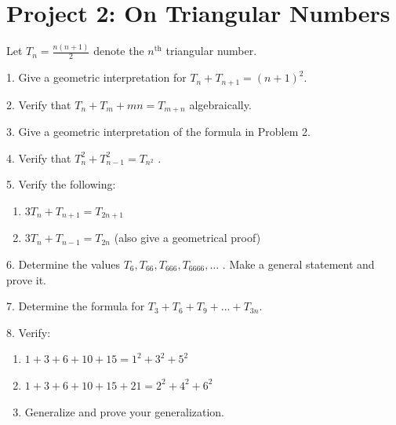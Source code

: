\documentclass[10pt,]{book}
\theoremstyle{plain}
\theoremstyle{definition}
\theoremstyle{definition}
\theoremstyle{definition}
\numberwithin{equation}{chapter}
\begin{document}
\section[{Project 2: On Triangular Numbers}]{Project 2: On Triangular Numbers}\label{exercises-2}
\hypertarget{p-1742}{}%
Let \(T_{n} = \frac{n\left( n + 1 \right)}{2}\) denote the \(n^{\text{th}}\) triangular number.%
\begin{exerciselist}
\item[1.]\hypertarget{exercise-10}{}\hypertarget{p-1743}{}%
Give a geometric interpretation for \(T_{n} + T_{n + 1} = \left( n + 1 \right)^{2}.\)%
\par\smallskip
\item[2.]\hypertarget{exercise-11}{}\hypertarget{p-1744}{}%
Verify that \(T_{n} + T_{m} + mn = T_{m + n}\) algebraically.%
\par\smallskip
\item[3.]\hypertarget{exercise-12}{}\hypertarget{p-1745}{}%
Give a geometric interpretation of the formula in Problem 2.%
\par\smallskip
\item[4.]\hypertarget{exercise-13}{}\hypertarget{p-1746}{}%
Verify that \(T_{n}^{2} + T_{n - 1}^{2} = T_{n^{2}}\) .%
\par\smallskip
\item[5.]\hypertarget{exercise-14}{}\hypertarget{p-1747}{}%
Verify the following: \leavevmode%
\begin{enumerate}[label=(\alph*)]
\item\hypertarget{li-79}{}\hypertarget{p-1748}{}%
\(3T_{n} + T_{n + 1} = T_{2n + 1}\)%
\item\hypertarget{li-80}{}\hypertarget{p-1749}{}%
\(3T_{n} + T_{n - 1} = T_{2n}\) (also give a geometrical proof)%
\end{enumerate}
%
\par\smallskip
\item[6.]\hypertarget{exercise-15}{}\hypertarget{p-1750}{}%
Determine the values \(T_{6},T_{66},T_{666},T_{6666},\ldots\) . Make a general statement and prove it.%
\par\smallskip
\item[7.]\hypertarget{exercise-16}{}\hypertarget{p-1751}{}%
Determine the formula for \(T_{3} + T_{6} + T_{9} + \ldots + T_{3n}.\)%
\par\smallskip
\item[8.]\hypertarget{exercise-17}{}\hypertarget{p-1752}{}%
Verify: \leavevmode%
\begin{enumerate}[label=(\alph*)]
\item\hypertarget{li-81}{}\hypertarget{p-1753}{}%
\(1 + 3 + 6 + 10 + 15 = 1^{2} + 3^{2} + 5^{2}\)%
\item\hypertarget{li-82}{}\hypertarget{p-1754}{}%
\(1 + 3 + 6 + 10 + 15 + 21 = 2^{2} + 4^{2} + 6^{2}\)%
\item\hypertarget{li-83}{}\hypertarget{p-1755}{}%
Generalize and prove your generalization.%
\end{enumerate}
%
\par\smallskip
\end{exerciselist}
\typeout{************************************************}
\typeout{************************************************}
\end{document}
